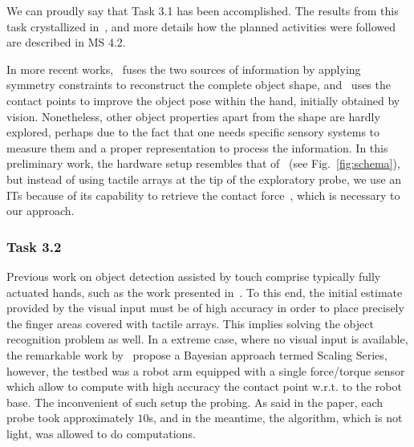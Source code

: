 \documentclass[a4paper,11pt,pdf]{pacmanreport}
\begin{document}
We can proudly say that Task 3.1 has been accomplished. The results from this task crystallized in~\cite{Rosales2014Active}, and more details how the planned activities were followed are described in MS 4.2. 

In more recent works,~\cite{Ilonen2013Fusing} fuses the two sources of information by applying symmetry constraints to reconstruct the complete object shape, and~\cite{Chalon2013Online} uses the contact points to improve the object pose within the hand, initially obtained by vision. Nonetheless, other object properties apart from the shape are hardly explored, perhaps due to the fact that one needs specific sensory systems to measure them and a proper representation to process the information. In this preliminary work, the hardware setup resembles that of~\cite{Bajcsy1984What} (see Fig.~\ref{fig:schema}), but instead of using tactile arrays at the tip of the exploratory probe, we use an ITs because of its capability to retrieve the contact force~\cite{Bicchi1993Contact}, which is necessary to our approach.

% 

\subsubsection{Task 3.2}

Previous work on object detection assisted by touch comprise typically fully actuated hands, such as the work presented in~\cite{Bimbo2013Combining}. To this end, the initial estimate provided by the visual input must be of high accuracy in order to place precisely the finger areas covered with tactile arrays. This implies solving the object recognition problem as well. In a extreme case, where no visual input is available, the remarkable work by~\cite{Petrovskaya2011Global} propose a Bayesian approach termed Scaling Series, however, the testbed was a robot arm equipped with a single force/torque sensor which allow to compute with high accuracy the contact point w.r.t. to the robot base. The inconvenient of such setup the probing. As said in the paper, each probe took approximately $10$s, and in the meantime, the algorithm, which is not light, was allowed to do computations. 
\end{document}
